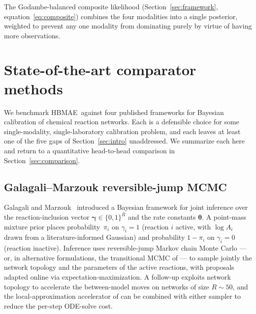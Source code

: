 \documentclass[12pt]{article}
\theoremstyle{plain}
\theoremstyle{definition}
\theoremstyle{remark}
\newcommand{\HBMAE}{HBMAE\xspace}
\begin{document}
The Godambe-balanced composite likelihood
(Section~\ref{sec:framework}, equation~\eqref{eq:composite}) combines the
four modalities into a single posterior, weighted to prevent any one
modality from dominating purely by virtue of having more observations.

\section{State-of-the-art comparator methods}\label{sec:sota}

We benchmark \HBMAE\ against four published frameworks for Bayesian calibration
of chemical reaction networks.  Each is a defensible choice for some
single-modality, single-laboratory calibration problem, and each leaves at
least one of the five gaps of Section~\ref{sec:intro} unaddressed.  We
summarize each here and return to a quantitative head-to-head comparison in
Section~\ref{sec:comparison}.

\subsection{Galagali--Marzouk reversible-jump MCMC}\label{sec:sota:gm}

Galagali and Marzouk~\citep{GalagaliMarzouk2015} introduced a Bayesian
framework for joint inference over the reaction-inclusion vector
$\boldsymbol\gamma\in\{0,1\}^R$ and the rate constants
$\boldsymbol{\theta}$.  A point-mass mixture prior places probability~$\pi_i$
on $\gamma_i=1$ (reaction $i$ active, with $\log A_i$ drawn from a
literature-informed Gaussian) and probability $1-\pi_i$ on $\gamma_i=0$
(reaction inactive).  Inference uses reversible-jump Markov chain Monte
Carlo \citep{Green1995} --- or, in alternative formulations, the
transitional MCMC of \citet{ChingChen2007} --- to sample jointly the
network topology and the parameters of the active reactions, with
proposals adapted online via expectation-maximization.  A
follow-up \citep{GalagaliMarzouk2019} exploits network topology to
accelerate the between-model moves on networks of size $R\sim 50$, and the
local-approximation accelerator of \citet{ConradMarzouk2016} can be
combined with either sampler to reduce the per-step ODE-solve cost.
\end{document}
